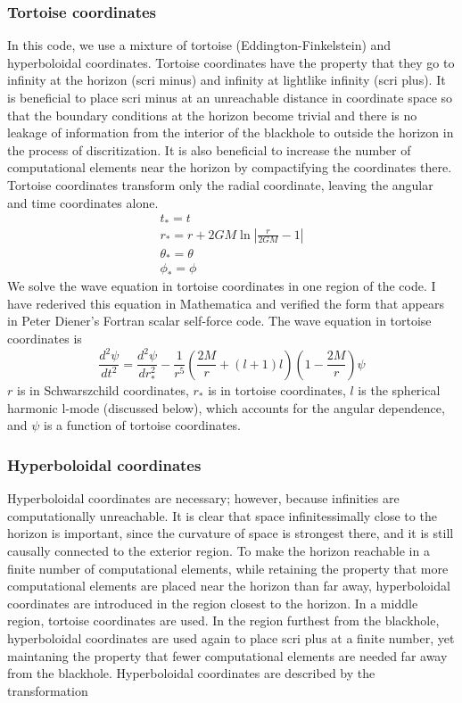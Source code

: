 \subsubsection{Tortoise coordinates}
In this code, we use a mixture of tortoise (Eddington-Finkelstein) and hyperboloidal coordinates. Tortoise coordinates have the property that they go to infinity at the horizon (scri minus) and infinity at lightlike infinity (scri plus). It is beneficial to place scri minus at an unreachable distance in coordinate space so that the boundary conditions at the horizon become trivial and there is no leakage of information from the interior of the blackhole to outside the horizon in the process of discritization. It is also beneficial to increase the number of computational elements near the horizon by compactifying the coordinates there. Tortoise coordinates transform only the radial coordinate, leaving the angular and time coordinates alone.~\cite{Wald}
\begin{eqnarray}
  t_*=t\\
  r_*=r+2GM\ln|\frac{r}{2GM}-1|\\
  \theta_*=\theta\\
  \phi_*=\phi
\end{eqnarray}
We solve the wave equation in tortoise coordinates in one region of the code. I have rederived this equation in Mathematica and verified the form that appears in Peter Diener's Fortran scalar self-force code. The wave equation in tortoise coordinates is
\begin{equation}
  \frac{d^2\psi}{dt^2}=\frac{d^2\psi}{dr_*^2}-\frac{1}{r^5}(\frac{2M}{r}+(l+1)l)(1-\frac{2M}{r})\psi
\end{equation}
$r$ is in Schwarszchild coordinates, $r_*$ is in tortoise coordinates, $l$ is the spherical harmonic l-mode (discussed below), which accounts for the angular dependence, and $\psi$ is a function of tortoise coordinates.


\subsubsection{Hyperboloidal coordinates}  
Hyperboloidal coordinates are necessary; however, because infinities are computationally unreachable. It is clear that space infinitessimally close to the horizon is important, since the curvature of space is strongest there, and it is still causally connected to the exterior region. To make the horizon reachable in a finite number of computational elements, while retaining the property that more computational elements are placed near the horizon than far away, hyperboloidal coordinates are introduced in the region closest to the horizon. In a middle region, tortoise coordinates are used. In the region furthest from the blackhole, hyperboloidal coordinates are used again to place scri plus at a finite number, yet maintaning the property that fewer computational elements are needed far away from the blackhole. Hyperboloidal coordinates are described by the transformation~\cite{hyperboloidalCoordinates}

